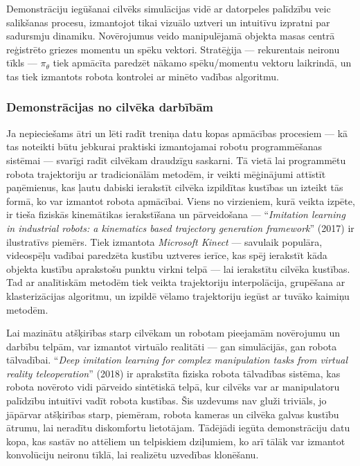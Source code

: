 \documentclass[12pt, a4paper]{article}
\numberwithin{equation}{section} %
\begin{document}
Demonstrāciju iegūšanai cilvēks simulācijas vidē ar datorpeles palīdzību veic salikšanas procesu, izmantojot tikai vizuālo uztveri un intuitīvu izpratni par sadursmju dinamiku. Novērojumus veido manipulējamā objekta masas centrā reģistrēto griezes momentu un spēku vektori. Stratēģija --- rekurentais neironu tīkls --- $\pi_{\theta}$ tiek apmācīta paredzēt nākamo spēku/momentu vektoru laikrindā, un tas tiek izmantots robota kontrolei ar minēto vadības algoritmu.

\subsubsection{Demonstrācijas no cilvēka darbībām}

Ja nepieciešams ātri un lēti radīt treniņa datu kopas apmācības procesiem --- kā tas noteikti būtu jebkurai praktiski izmantojamai robotu programmēšanas sistēmai --- svarīgi radīt cilvēkam draudzīgu saskarni. Tā vietā lai programmētu robota trajektoriju ar tradicionālām metodēm, ir veikti mēģinājumi attīstīt paņēmienus, kas ļautu dabiski ierakstīt cilvēka izpildītas kustības un izteikt tās formā, ko var izmantot robota apmācībai. Viens no virzieniem, kurā veikta izpēte, ir tieša fiziskās kinemātikas ierakstīšana un pārveidošana --- ``\textit{Imitation learning in industrial robots: a kinematics based trajectory generation framework}'' \cite{jha2017imitation} (2017) ir ilustratīvs piemērs. Tiek izmantota \textit{Microsoft Kinect} --- savulaik populāra, videospēļu vadībai paredzēta kustību uztveres ierīce, kas spēj ierakstīt kāda objekta kustību aprakstošu punktu virkni telpā --- lai ierakstītu cilvēka kustības. Tad ar analītiskām metodēm tiek veikta trajektoriju interpolācija, grupēšana ar klasterizācijas algoritmu, un izpildē vēlamo trajektoriju iegūst ar tuvāko kaimiņu metodēm.

Lai mazinātu atšķirības starp cilvēkam un robotam pieejamām novērojumu un darbību telpām, var izmantot virtuālo realitāti --- gan simulācijās, gan robota tālvadībai. ``\textit{Deep imitation learning for complex manipulation tasks from virtual reality teleoperation}'' \cite{zhang2018deep} (2018) ir aprakstīta fiziska robota tālvadības sistēma, kas robota novēroto vidi pārveido sintētiskā telpā, kur cilvēks var ar manipulatoru palīdzību intuitīvi vadīt robota kustības. Šis uzdevums nav gluži triviāls, jo jāpārvar atšķirības starp, piemēram, robota kameras un cilvēka galvas kustību ātrumu, lai neradītu diskomfortu lietotājam. Tādējādi iegūta demonstrāciju datu kopa, kas sastāv no attēliem un telpiskiem dziļumiem, ko arī tālāk var izmantot konvolūciju neironu tīklā, lai realizētu uzvedības klonēšanu.
\end{document}
